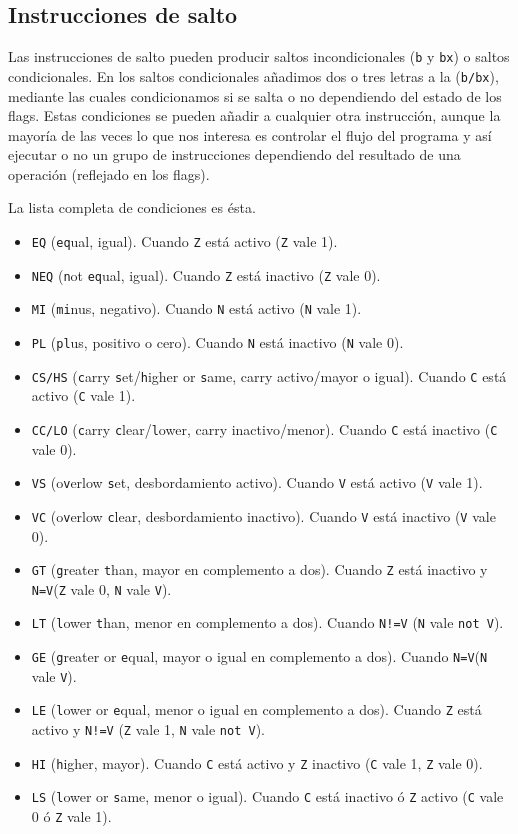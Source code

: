 \subsection{Instrucciones de salto}

Las instrucciones de salto pueden producir saltos incondicionales ({\tt b} y {\tt bx})
o saltos condicionales. En los saltos condicionales añadimos dos o tres letras
a la ({\tt b/bx}), mediante las cuales condicionamos si se salta o no dependiendo
del estado de los flags. Estas condiciones se pueden añadir a cualquier
otra instrucción, aunque la mayoría de las veces lo que nos interesa es controlar
el flujo del programa y así ejecutar o no un grupo de instrucciones dependiendo
del resultado de una operación (reflejado en los flags).

La lista completa de condiciones es ésta.

\begin{itemize}
  \item{\tt EQ} ({\tt eq}ual, igual). Cuando {\tt Z} está activo ({\tt Z} vale 1).
  \item{\tt NEQ} ({\tt n}ot {\tt eq}ual, igual). Cuando {\tt Z} está inactivo ({\tt Z} vale 0).
  \item{\tt MI} ({\tt mi}nus, negativo). Cuando {\tt N} está activo ({\tt N} vale 1).
  \item{\tt PL} ({\tt pl}us, positivo o cero). Cuando {\tt N} está inactivo ({\tt N} vale 0).
  \item{\tt CS/HS} ({\tt c}arry {\tt s}et/{\tt h}igher or {\tt s}ame, carry activo/mayor o igual). Cuando {\tt C} está activo ({\tt C} vale 1).
  \item{\tt CC/LO} ({\tt c}arry {\tt c}lear/{\tt l}ower, carry inactivo/menor). Cuando {\tt C} está inactivo ({\tt C} vale 0).
  \item{\tt VS} (o{\tt v}erlow {\tt s}et, desbordamiento activo). Cuando {\tt V} está activo ({\tt V} vale 1).
  \item{\tt VC} (o{\tt v}erlow {\tt c}lear, desbordamiento inactivo). Cuando {\tt V} está inactivo ({\tt V} vale 0).
  \item{\tt GT} ({\tt g}reater {\tt t}han, mayor en complemento a dos). Cuando {\tt Z} está inactivo y {\tt N=V}({\tt Z} vale 0, {\tt N} vale {\tt V}).
  \item{\tt LT} ({\tt l}ower {\tt t}han, menor en complemento a dos). Cuando {\tt N!=V} ({\tt N} vale {\tt not V}).
  \item{\tt GE} ({\tt g}reater or {\tt e}qual, mayor o igual en complemento a dos). Cuando {\tt N=V}({\tt N} vale {\tt V}).
  \item{\tt LE} ({\tt l}ower or {\tt e}qual, menor o igual en complemento a dos). Cuando {\tt Z} está activo y {\tt N!=V} ({\tt Z} vale 1, {\tt N} vale {\tt not V}).
  \item{\tt HI} ({\tt h}igher, mayor). Cuando {\tt C} está activo y {\tt Z} inactivo ({\tt C} vale 1, {\tt Z} vale 0).
  \item{\tt LS} ({\tt l}ower or {\tt s}ame, menor o igual). Cuando {\tt C} está inactivo ó {\tt Z} activo ({\tt C} vale 0 ó {\tt Z} vale 1).
\end{itemize}

